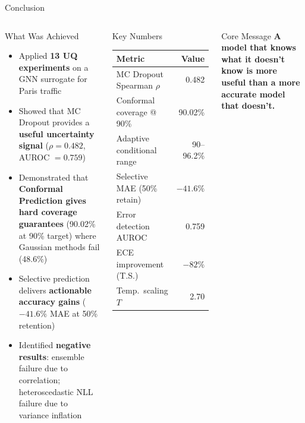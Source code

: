 \documentclass[aspectratio=169,10pt]{beamer}
\newcommand{\emphblue}[1]{\textcolor{tumblue}{\textbf{#1}}}
\newcommand{\emphred}[1]{\textcolor{tumred}{\textbf{#1}}}
\begin{document}
\begin{frame}{Conclusion}
  \begin{columns}[c]
      \begin{block}{What Was Achieved}
        \begin{itemize}
          \item Applied \textbf{13 UQ experiments} on a GNN surrogate for Paris traffic
          \item Showed that MC Dropout provides a \emphblue{useful uncertainty signal} ($\rho = 0.482$, AUROC $= 0.759$)
          \item Demonstrated that \emphblue{Conformal Prediction gives hard coverage guarantees} (90.02\% at 90\% target) where Gaussian methods fail (48.6\%)
          \item Selective prediction delivers \emphblue{actionable accuracy gains} ($-41.6\%$ MAE at 50\% retention)
          \item Identified \emphred{negative results}: ensemble failure due to correlation; heteroscedastic NLL failure due to variance inflation
        \end{itemize}
      \end{block}
      \begin{exampleblock}{Key Numbers}
        \renewcommand{\arraystretch}{1.3}
        \begin{tabular}{lr}
          \toprule
          \textbf{Metric} & \textbf{Value} \\
          \midrule
          MC Dropout Spearman $\rho$ & 0.482 \\
          Conformal coverage @ 90\% & 90.02\% \\
          Adaptive conditional range & 90–96.2\% \\
          Selective MAE (50\% retain) & $-41.6\%$ \\
          Error detection AUROC & 0.759 \\
          ECE improvement (T.S.) & $-82\%$ \\
          Temp.\ scaling $T$ & 2.70 \\
          \bottomrule
        \end{tabular}
      \end{exampleblock}
      \vspace{0.3em}
      \begin{alertblock}{Core Message}
        \emphblue{A model that knows what it doesn't know is more useful than a more accurate model that doesn't.}
      \end{alertblock}
  \end{columns}
\end{frame}
\end{document}
